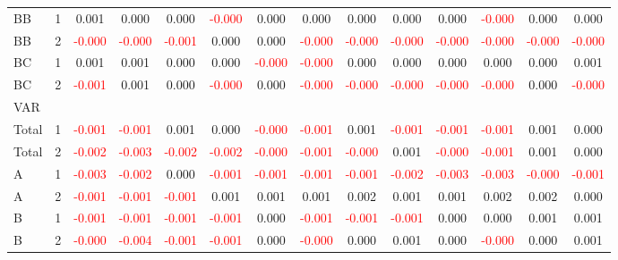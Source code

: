 \begin{table}[!htb]
{\begin{tabular}{llcccccccccccc}
BB & 1 & 0.001 & 0.000 & 0.000 & \textcolor{red}{-0.000} & 0.000 & 0.000 & 0.000 & 0.000 & 0.000 & \textcolor{red}{-0.000} & 0.000 & 0.000\\
BB & 2 & \textcolor{red}{-0.000} & \textcolor{red}{-0.000} & \textcolor{red}{-0.001} & 0.000 & 0.000 & \textcolor{red}{-0.000} & \textcolor{red}{-0.000} & \textcolor{red}{-0.000} & \textcolor{red}{-0.000} & \textcolor{red}{-0.000} & \textcolor{red}{-0.000} & \textcolor{red}{-0.000}\\
BC & 1 & 0.001 & 0.001 & 0.000 & 0.000 & \textcolor{red}{-0.000} & \textcolor{red}{-0.000} & 0.000 & 0.000 & 0.000 & 0.000 & 0.000 & 0.001\\
BC & 2 & \textcolor{red}{-0.001} & 0.001 & 0.000 & \textcolor{red}{-0.000} & 0.000 & \textcolor{red}{-0.000} & \textcolor{red}{-0.000} & \textcolor{red}{-0.000} & \textcolor{red}{-0.000} & \textcolor{red}{-0.000} & 0.000 & \textcolor{red}{-0.000}\\
\hline
VAR &  &  &  &  &  &  &  &  &  &  &  &  & \\
\hline
Total & 1 & \textcolor{red}{-0.001} & \textcolor{red}{-0.001} & 0.001 & 0.000 & \textcolor{red}{-0.000} & \textcolor{red}{-0.001} & 0.001 & \textcolor{red}{-0.001} & \textcolor{red}{-0.001} & \textcolor{red}{-0.001} & 0.001 & 0.000\\
Total & 2 & \textcolor{red}{-0.002} & \textcolor{red}{-0.003} & \textcolor{red}{-0.002} & \textcolor{red}{-0.002} & \textcolor{red}{-0.000} & \textcolor{red}{-0.001} & \textcolor{red}{-0.000} & 0.001 & \textcolor{red}{-0.000} & \textcolor{red}{-0.001} & 0.001 & 0.000\\
A & 1 & \textcolor{red}{-0.003} & \textcolor{red}{-0.002} & 0.000 & \textcolor{red}{-0.001} & \textcolor{red}{-0.001} & \textcolor{red}{-0.001} & \textcolor{red}{-0.001} & \textcolor{red}{-0.002} & \textcolor{red}{-0.003} & \textcolor{red}{-0.003} & \textcolor{red}{-0.000} & \textcolor{red}{-0.001}\\
A & 2 & \textcolor{red}{-0.001} & \textcolor{red}{-0.001} & \textcolor{red}{-0.001} & 0.001 & 0.001 & 0.001 & 0.002 & 0.001 & 0.001 & 0.002 & 0.002 & 0.000\\
B & 1 & \textcolor{red}{-0.001} & \textcolor{red}{-0.001} & \textcolor{red}{-0.001} & \textcolor{red}{-0.001} & 0.000 & \textcolor{red}{-0.001} & \textcolor{red}{-0.001} & \textcolor{red}{-0.001} & 0.000 & 0.000 & 0.001 & 0.001\\
B & 2 & \textcolor{red}{-0.000} & \textcolor{red}{-0.004} & \textcolor{red}{-0.001} & \textcolor{red}{-0.001} & 0.000 & \textcolor{red}{-0.000} & 0.000 & 0.001 & 0.000 & \textcolor{red}{-0.000} & 0.000 & 0.001\\

\end{tabular}}
\end{table}
